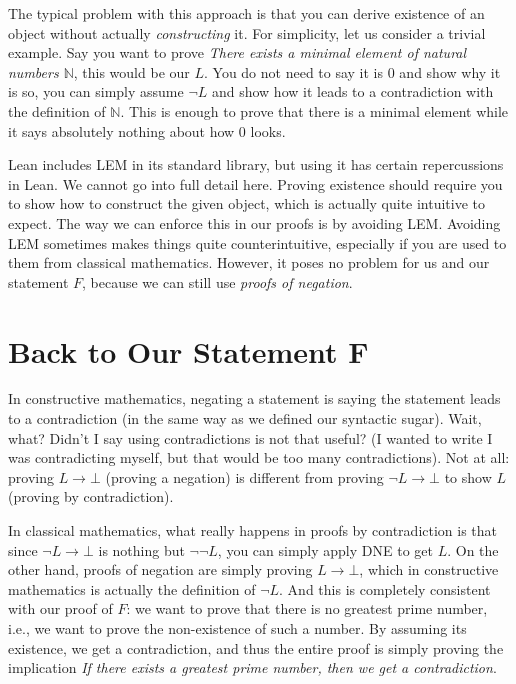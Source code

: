 \documentclass{article}
\begin{document}
The typical problem with this approach is that you can derive existence of an object without actually \emph{constructing} it.
For simplicity, let us consider a trivial example. 
Say you want to prove \emph{There exists a minimal element of natural numbers $\mathbb{N}$}, this would be our $L$.
You do not need to say it is $0$ and show why it is so, you can simply assume $\neg L$ and show how it leads to a contradiction with the definition of $\mathbb{N}$.
This is enough to prove that there is a minimal element while it says absolutely nothing about how $0$ looks.

Lean includes LEM in its standard library, but using it has certain repercussions in Lean.
We cannot go into full detail here.
Proving existence should require you to show how to construct the given object, which is actually quite intuitive to expect.
The way we can enforce this in our proofs is by avoiding LEM.
Avoiding LEM sometimes makes things quite counterintuitive, especially if you are used to them from classical mathematics.
However, it poses no problem for us and our statement $F$, because we can still use \emph{proofs of negation}.

\section{Back to Our Statement F}
\label{negation}

In constructive mathematics, negating a statement is saying the statement leads to a contradiction (in the same way as we defined our syntactic sugar).
Wait, what? 
Didn't I say using contradictions is not that useful?
(I wanted to write I was contradicting myself, but that would be too many contradictions).
Not at all: proving $L \to \bot$ (proving a negation) is different from proving $\neg L \to \bot$ to show $L$ (proving by contradiction).

In classical mathematics, what really happens in proofs by contradiction is that since $\neg L \to \bot$ is nothing but $\neg \neg L$, you can simply apply DNE to get $L$. 
On the other hand, proofs of negation are simply proving $L \to \bot$, which in constructive mathematics is actually the definition of $\neg L$.
And this is completely consistent with our proof of $F$: we want to prove that there is no greatest prime number, i.e., we want to prove the non-existence of such a number.
By assuming its existence, we get a contradiction, and thus the entire proof is simply proving the implication \emph{If there exists a greatest prime number, then we get a contradiction}.
\end{document}
